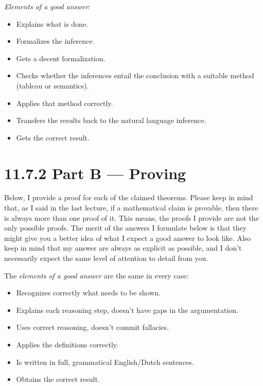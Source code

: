 \begin{itemize}
        \emph{Elements of a good answer}:

        \begin{itemize}
        \item Explains what is done.
        \item Formalizes the inference.
        \item Gets a decent formalization.
        \item Checks whether the inferences entail the conclusion with
          a suitable method (tableau or semantics).
        \item Applies that method correctly.
        \item Transfers the results back to the natural language
          inference.
        \item Gets the correct result.
        \end{itemize}
    
      \end{itemize}

      \section*{11.7.2 Part B --- Proving}

      Below, I provide a proof for each of the claimed
      theorems. Please keep in mind that, as I said in the last
      lecture, if a mathematical claim is provable, then there is
      always more than one proof of it. This means, the proofs I
      provide are not the only possible proofs. The merit of the%
      answers I formulate below is that they might give you a better
      idea of what I expect a good answer to look like. Also keep in
      mind that my answer are always as explicit as possible, and I
      don't necessarily expect the same level of attention to detail
      from you.
      
      The
      \emph{elements of a good answer} are the same in every case:
      \begin{itemize}
      \item Recognizes correctly what needs to be shown.
      \item Explains each reasoning step, doesn't have gaps in the
        argumentation.
      \item Uses correct reasoning, doesn't commit fallacies.
      \item Applies the definitions correctly.
      \item Is written in full, grammatical English/Dutch sentences.
      \item Obtains the correct result.
      \end{itemize}


